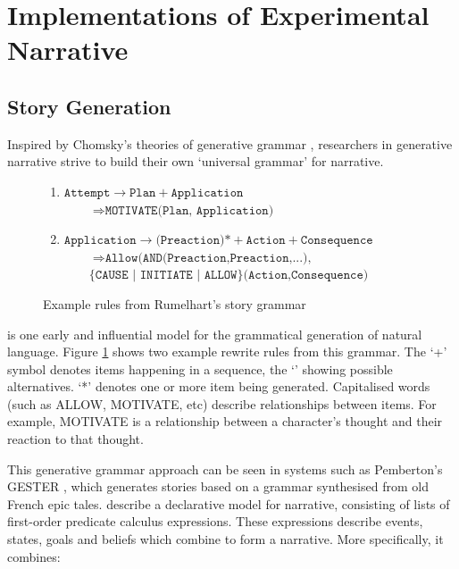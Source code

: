 \section{Implementations of Experimental Narrative}
\label{sec:implementations}

\subsection{Story Generation}
Inspired by Chomsky's theories of generative grammar \citep{chomsky1968sound}, researchers in generative narrative strive to build their own `universal grammar' for narrative.

\begin{figure}[!t]
  \begin{center}
  \begin{enumerate}
    \item $\texttt{Attempt}\rightarrow \texttt{Plan} + \texttt{Application}$\\
           $\qquad\Rightarrow\texttt{MOTIVATE(Plan, Application)}$
    \item $\texttt{Application}\rightarrow\texttt{(Preaction)*} + \texttt{Action} + \texttt{Consequence}$\\
           $\qquad\Rightarrow\texttt{Allow(AND(Preaction,Preaction,...),}$\\
           $\qquad\{\texttt{CAUSE | INITIATE | ALLOW}\}\texttt{(Action,Consequence)}$
  \end{enumerate}
  \end{center}

  \caption{Example rules from Rumelhart's story grammar}\label{fig:rumelhart}
\end{figure}

\citet{rumelhart1975notes} is one early and influential model for the grammatical generation of natural language. Figure \ref{fig:rumelhart} shows two example rewrite rules from this grammar. The `+' symbol denotes items happening in a sequence, the `\textbar' showing possible alternatives. `*' denotes one or more item being generated. Capitalised words (such as ALLOW, MOTIVATE, etc) describe relationships between items. For example, MOTIVATE is a relationship between a character's thought and their reaction to that thought.

This generative grammar approach can be seen in systems such as Pemberton's GESTER \citep{pemberton1989modular}, which generates stories based on a grammar synthesised from old French epic tales. \citet{lang1999declarative} describe a declarative model for narrative, consisting of lists of first-order predicate calculus expressions. These expressions describe events, states, goals and beliefs which combine to form a narrative. More specifically, it combines:

